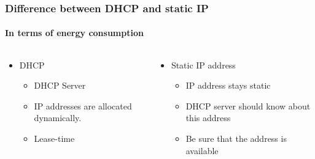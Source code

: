 \begin{frame}
    \frametitle{Difference between DHCP and static IP}
    \framesubtitle{In terms of energy consumption}

    \begin{columns}
        \begin{column}{0.5\textwidth}
            \begin{itemize}
                \item DHCP
                      \begin{itemize}
                          \item DHCP Server
                          \item IP addresses are allocated dynamically.
                          \item Lease-time
                      \end{itemize}
            \end{itemize}
        \end{column}
        \begin{column}{0.5\textwidth}
            \begin{itemize}
                \item Static IP address
                      \begin{itemize}
                          \item IP address stays static
                          \item DHCP server should know about this address
                          \item Be sure that the address is available
                      \end{itemize}
            \end{itemize}
        \end{column}
    \end{columns}
\end{frame}


